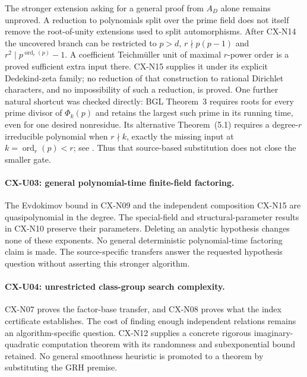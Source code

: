 The stronger extension asking for a general proof from $A_D$ alone
remains unproved. A reduction to polynomials split over the prime field
does not itself remove the root-of-unity extensions used to split
automorphisms. After CX-N14 the uncovered branch can be restricted to
$p>d$, $r\nmid p(p-1)$ and
$r^2\mid p^{\operatorname{ord}_r(p)}-1$.
A coefficient Teichmüller unit of maximal $r$-power order is a proved
sufficient extra input there. CX-N15 supplies it under its explicit
Dedekind-zeta family; no reduction of that construction to rational
Dirichlet characters, and no impossibility of such a reduction, is proved.
One further natural shortcut was checked directly: BGL Theorem~3
requires roots for every prime divisor of $\Phi_k(p)$ and retains the
largest such prime in its running time, even for one desired nonresidue.
Its alternative Theorem~(5.1) requires a degree-$r$ irreducible polynomial
when $r\nmid k$, exactly the missing input at $k=\operatorname{ord}_r(p)<r$;
see \cite[\S5, p.~20 and algorithm pp.~20--24]{CXNBGL01}.
Thus that source-based substitution does not close the smaller gate.

\paragraph{CX-U03: general polynomial-time finite-field factoring.}
The Evdokimov bound in CX-N09 and the independent composition CX-N15
are quasipolynomial in the degree.
The special-field and structural-parameter results in CX-N10 preserve
their parameters. Deleting an analytic hypothesis changes none of
these exponents. No general deterministic polynomial-time factoring
claim is made. The source-specific transfers answer the requested
hypothesis question without asserting this stronger algorithm.

\paragraph{CX-U04: unrestricted class-group search complexity.}
CX-N07 proves the factor-base transfer, and CX-N08 proves what the
index certificate establishes. The cost of finding enough independent
relations remains an algorithm-specific question. CX-N12 supplies a
concrete rigorous imaginary-quadratic computation theorem with its
randomness and subexponential bound retained. No general smoothness
heuristic is promoted to a theorem by substituting the GRH premise.

